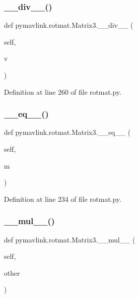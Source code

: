 \subsubsection{\texorpdfstring{\_\_div\_\_()}{\_\_div\_\_()}}
{\footnotesize\ttfamily def pymavlink.\+rotmat.\+Matrix3.\+\_\+\+\_\+div\+\_\+\+\_\+ (\begin{DoxyParamCaption}\item[{}]{self,  }\item[{}]{v }\end{DoxyParamCaption})}



Definition at line 260 of file rotmat.\+py.

\mbox{\label{classpymavlink_1_1rotmat_1_1Matrix3_ae2ca508d27e007a96b7f669620949431}} 
\subsubsection{\texorpdfstring{\_\_eq\_\_()}{\_\_eq\_\_()}}
{\footnotesize\ttfamily def pymavlink.\+rotmat.\+Matrix3.\+\_\+\+\_\+eq\+\_\+\+\_\+ (\begin{DoxyParamCaption}\item[{}]{self,  }\item[{}]{m }\end{DoxyParamCaption})}



Definition at line 234 of file rotmat.\+py.

\mbox{\label{classpymavlink_1_1rotmat_1_1Matrix3_a1ef3cbd6ff8b2a5552ab1815368bea73}} 
\subsubsection{\texorpdfstring{\_\_mul\_\_()}{\_\_mul\_\_()}}
{\footnotesize\ttfamily def pymavlink.\+rotmat.\+Matrix3.\+\_\+\+\_\+mul\+\_\+\+\_\+ (\begin{DoxyParamCaption}\item[{}]{self,  }\item[{}]{other }\end{DoxyParamCaption})}



